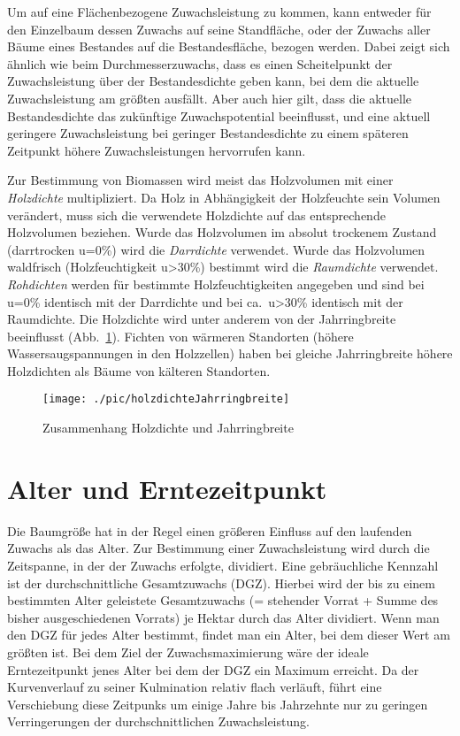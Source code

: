 \documentclass[twocolumn]{scrartcl}
\begin{document}
Um auf eine Flächenbezogene Zuwachsleistung zu kommen, kann entweder für den
Einzelbaum dessen Zuwachs auf seine Standfläche, oder der Zuwachs aller Bäume
eines Bestandes auf die Bestandesfläche, bezogen werden. Dabei zeigt sich
ähnlich wie beim Durchmesserzuwachs, dass es einen Scheitelpunkt der
Zuwachsleistung über der Bestandesdichte geben kann, bei dem die aktuelle
Zuwachsleistung am größten ausfällt. Aber auch hier gilt, dass die aktuelle
Bestandesdichte das zukünftige Zuwachspotential beeinflusst, und eine aktuell
geringere Zuwachsleistung bei geringer Bestandesdichte zu einem späteren
Zeitpunkt höhere Zuwachsleistungen hervorrufen kann.

Zur Bestimmung von Biomassen wird meist das Holzvolumen mit einer
\emph{Holzdichte} multipliziert. Da Holz in Abhängigkeit der
Holzfeuchte sein Volumen verändert, muss sich die verwendete Holzdichte auf das
entsprechende Holzvolumen beziehen. Wurde das Holzvolumen im absolut trockenem
Zustand (darrtrocken u=0\%) wird die
\emph{Darrdichte}
verwendet. Wurde das Holzvolumen waldfrisch (Holzfeuchtigkeit u>30\%) bestimmt
wird die
\emph{Raumdichte}
verwendet.
\emph{Rohdichten}
werden für bestimmte Holzfeuchtigkeiten angegeben und sind bei u=0\% identisch
mit der Darrdichte und bei ca.\ u>30\% identisch mit der Raumdichte. Die
Holzdichte wird unter anderem von der Jahrringbreite beeinflusst (Abb.\
\ref{fig:holzdichteJahrringbreite}). Fichten von wärmeren Standorten (höhere
Wassersaugspannungen in den Holzzellen) haben bei gleiche Jahrringbreite höhere
Holzdichten als Bäume von kälteren Standorten.

\begin{figure}[htbp]
  \centering
  \texttt{[image: ./pic/holzdichteJahrringbreite]}
  \caption{Zusammenhang Holzdichte und Jahrringbreite}
  \label{fig:holzdichteJahrringbreite}
\end{figure}


\section{Alter und Erntezeitpunkt}
\label{sec:AlterUndErntezeitpunkt}

Die Baumgröße hat in der Regel einen größeren Einfluss auf den laufenden Zuwachs
als das Alter. Zur Bestimmung einer Zuwachsleistung wird durch die Zeitspanne,
in der der Zuwachs erfolgte, dividiert. Eine gebräuchliche Kennzahl ist der
durchschnittliche Gesamtzuwachs (DGZ). Hierbei wird der bis zu einem bestimmten
Alter geleistete Gesamtzuwachs (= stehender Vorrat + Summe des bisher
ausgeschiedenen Vorrats) je Hektar durch das Alter dividiert. Wenn man den DGZ
für jedes Alter bestimmt, findet man ein Alter, bei dem dieser Wert am größten
ist. Bei dem Ziel der Zuwachsmaximierung wäre der ideale Erntezeitpunkt jenes
Alter bei dem der DGZ ein Maximum erreicht. Da der Kurvenverlauf zu seiner
Kulmination relativ flach verläuft, führt eine Verschiebung diese Zeitpunks um
einige Jahre bis Jahrzehnte nur zu geringen Verringerungen der
durchschnittlichen Zuwachsleistung.
\end{document}
